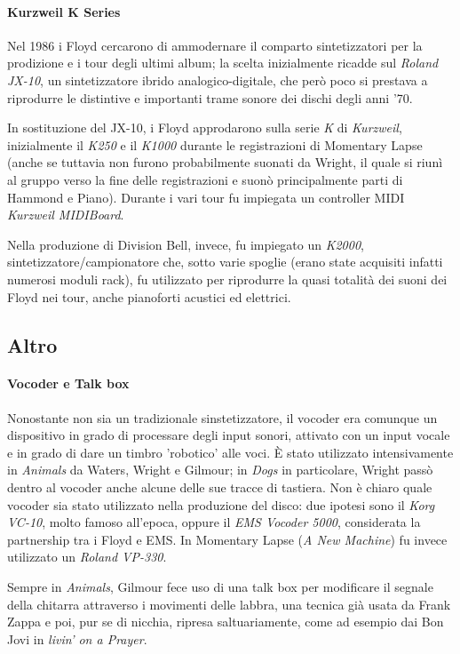 \documentclass[class=book, crop=false, oneside, 12pt]{standalone}
\begin{document}
    \paragraph{Kurzweil K Series}
    Nel 1986 i Floyd cercarono di ammodernare il comparto sintetizzatori per la prodizione e i  tour degli ultimi album; la scelta inizialmente ricadde sul \emph{Roland JX-10}, un sintetizzatore ibrido analogico-digitale, che però poco si prestava a riprodurre le distintive e importanti trame sonore dei dischi degli anni '70.

    In sostituzione del JX-10, i Floyd approdarono sulla serie \emph{K} di \emph{Kurzweil}, inizialmente il \emph{K250} e il \emph{K1000} durante le registrazioni di Momentary Lapse (anche se tuttavia non furono probabilmente suonati da Wright, il quale si riunì al gruppo verso la fine delle registrazioni e suonò principalmente parti di Hammond e Piano). Durante i vari tour fu impiegata un controller MIDI \emph{Kurzweil MIDIBoard}.

    Nella produzione di Division Bell, invece, fu impiegato un \emph{K2000}, sintetizzatore/campionatore che, sotto varie spoglie (erano state acquisiti infatti numerosi moduli rack), fu utilizzato per riprodurre la quasi totalità dei suoni dei Floyd nei tour, anche pianoforti acustici ed elettrici.
    
    \subsection{Altro}
    \paragraph{Vocoder e Talk box}
    Nonostante non sia un tradizionale sinstetizzatore, il vocoder era comunque un dispositivo in grado di processare degli input sonori, attivato con un input vocale e in grado di dare un timbro 'robotico' alle voci. È stato utilizzato intensivamente in \emph{Animals} da Waters, Wright e Gilmour; in \emph{Dogs} in particolare, Wright passò dentro al vocoder anche alcune delle sue tracce di tastiera. Non è chiaro quale vocoder sia stato utilizzato nella produzione del disco: due ipotesi sono il \emph{Korg VC-10}, molto famoso all'epoca, oppure il \emph{EMS Vocoder 5000}, considerata la partnership tra i Floyd e EMS. In Momentary Lapse (\emph{A New Machine}) fu invece utilizzato un \emph{ Roland VP-330}.

    Sempre in \emph{Animals}, Gilmour fece uso di una talk box per modificare il segnale della chitarra attraverso i movimenti delle labbra, una tecnica già usata da Frank Zappa e poi, pur se di nicchia, ripresa saltuariamente, come ad esempio dai Bon Jovi in \emph{livin' on a Prayer}.
    
\end{document}
